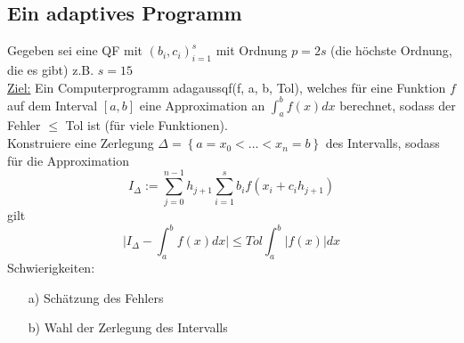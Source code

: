 \subsection{Ein adaptives Programm}

Gegeben sei eine QF mit $(b_i, c_i)_{i=1}^s$ mit Ordnung $p=2s$ (die höchste Ordnung, die es gibt) z.B. $s=15$ \\
\underline{Ziel:} Ein Computerprogramm adagaussqf(f, a, b, Tol), welches für eine Funktion $f$ auf dem Interval $[a, b]$ eine Approximation an $\int_a^b f(x) dx$ berechnet, sodass der Fehler $\leq$ Tol ist (für viele Funktionen). \\
Konstruiere eine Zerlegung $\Delta = \left\{ a = x_0 < ... < x_n = b\right\}$ des Intervalls, sodass für die Approximation 
$$I_\Delta := \sum_{j=0}^{n-1} h_{j+1} \sum_{i=1}^s b_if(x_i + c_ih_{j+1})$$
gilt 
$$\vert I_\Delta - \int_a^b f(x) dx \vert \leq Tol \int_a^b \vert f(x) \vert dx $$
Schwierigkeiten:

\begin{enumerate}
  \item[a)] Schätzung des Fehlers
  \item[b)] Wahl der Zerlegung des Intervalls 
\end{enumerate}

